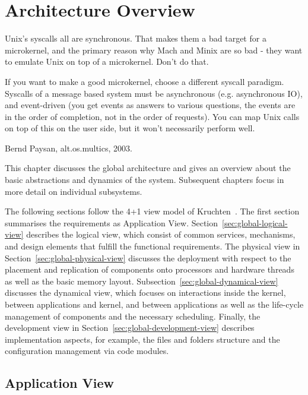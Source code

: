 \chapter{Architecture Overview}
\label{chapter:arch-overview}

\epigraph{Unix's syscalls all are synchronous. That makes them a bad target for a microkernel, and the primary reason why Mach and Minix are so bad - they want to emulate Unix on top of a microkernel. Don't do that.

If you want to make a good microkernel, choose a different syscall paradigm. Syscalls of a message based system must be asynchronous (e.g. asynchronous IO), and event-driven (you get events as answers to various questions, the events are in the order of completion, not in the order of requests). You can map Unix calls on top of this on the user side, but it won't necessarily perform well.}{Bernd Paysan, alt.os.multics, 2003.}

\noindent
This chapter discusses the global architecture and gives an overview
about the basic abstractions and dynamics of the system.
Subsequent chapters focus in more detail on individual subsystems.

The following sections follow the 4+1 view model of Kruchten~\cite{kruchten19954+}.
The first section summarises the requirements as Application View. 
Section~\ref{sec:global-logical-view} describes the logical view, which consist of common services, mechanisms, and design elements that fulfill the functional requirements.
The physical view in Section~\ref{sec:global-physical-view} discusses the deployment with respect to the placement and replication of components onto processors and hardware threads as well as the basic memory layout.
Subsection~\ref{sec:global-dynamical-view} discusses the dynamical view, which focuses on interactions inside the kernel, between applications and kernel, and between applications as well as the life-cycle management of components and the necessary scheduling.
Finally, the development view in Section~\ref{sec:global-development-view} describes implementation aspects, for example, the files and folders structure and the configuration management via code modules.

\section{Application View}
\label{sec:global-application-view}

